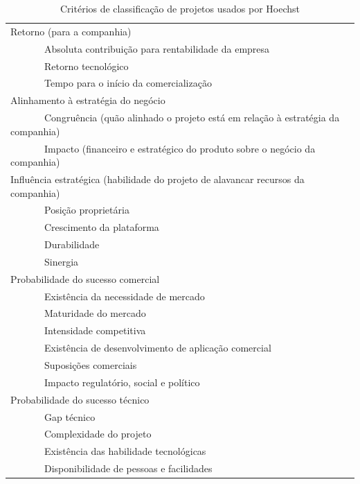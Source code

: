 \documentclass[12pt,a4paper,ruledheader,tocpage=prefix,floatnumber=continuous,pagestart=folhaderosto,font=times]{abnt}
\begin{document}
\begin{table}[H]
\begin{center}
 \begin{tabular}{| >{\arraybackslash}m{6in} |}
  \hline
  Retorno (para a companhia) \\
  \ \ \ \ \ \ \ Absoluta contribuição para rentabilidade da empresa\\
  \ \ \ \ \ \ \ Retorno tecnológico\\
  \ \ \ \ \ \ \ Tempo para o início da comercialização\\
  \hline			
  Alinhamento à estratégia do negócio \\
  \ \ \ \ \ \ \  Congruência (quão alinhado o projeto está em relação à estratégia da companhia)\\
  \ \ \ \ \ \ \ Impacto (financeiro e estratégico do produto sobre o negócio da companhia)\\
  \hline			
  Influência estratégica (habilidade do projeto de alavancar recursos da companhia) \\
  \ \ \ \ \ \ \ Posição proprietária\\
  \ \ \ \ \ \ \ Crescimento da plataforma\\
  \ \ \ \ \ \ \ Durabilidade\\
  \ \ \ \ \ \ \ Sinergia\\
  \hline			
  Probabilidade do sucesso comercial\\
  \ \ \ \ \ \ \ Existência da necessidade de mercado\\
  \ \ \ \ \ \ \ Maturidade do mercado\\
  \ \ \ \ \ \ \ Intensidade competitiva\\
  \ \ \ \ \ \ \ Existência de desenvolvimento de aplicação comercial\\
  \ \ \ \ \ \ \ Suposições comerciais\\
  \ \ \ \ \ \ \ Impacto regulatório, social e político\\
  \hline			
  Probabilidade do sucesso técnico\\
  \ \ \ \ \ \ \ Gap técnico\\
  \ \ \ \ \ \ \ Complexidade do projeto\\
  \ \ \ \ \ \ \ Existência das habilidade tecnológicas\\
  \ \ \ \ \ \ \ Disponibilidade de pessoas e facilidades\\
  \hline			
 \end{tabular}
\caption{Critérios de classificação de projetos usados por Hoechst\cite{COOPER2001}}
\end{center}
\end{table}
\end{document}
